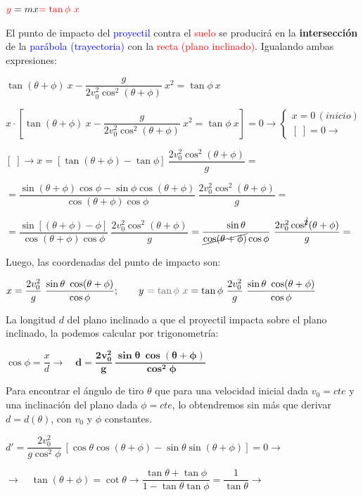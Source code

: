$\textcolor{red}{y}=mx\textcolor{red}{=\tan \phi \ x}$

El punto de impacto del \textcolor{blue}{proyectil} contra el \textcolor{red}{suelo} se producirá en la \textbf{intersección} de la \textcolor{blue}{parábola (trayectoria)} con la \textcolor{red}{recta (plano inclinado)}. Igualando ambas expresiones:

$\tan(\theta+\phi) \ x - \dfrac {g}{2 v_0^2 \cos^2 (\theta+\phi)}\ x^2=\tan \phi \ x$

$x\cdot \left[ 
\tan(\theta+\phi) \ x - \dfrac {g}{2 v_0^2 \cos^2 (\theta+\phi)}\ x^2=\tan \phi \ x
 \right]=0 \to  \begin{cases} x=0 \,(inicio) \\ [ \; ]=0 \to \end{cases}$


$[\;]\to x=\left[\tan (\theta+\phi)-\tan \phi  \right] \  \dfrac{2v_0^2 \cos^2(\theta+\phi)}{g} =$

$=\dfrac {\sin(\theta+\phi) \cos \phi-\sin \phi \cos(\theta+\phi)}{\cos(\theta+\phi) \cos \phi} \  \dfrac{2v_0^2 \cos^2(\theta+\phi)}{g} =$

$=\dfrac {\sin [(\theta+\phi)-\phi]}{\cos(\theta+\phi) \cos \phi} \ \dfrac{2v_0^2 \cos^2(\theta+\phi)}{g} $
$=\dfrac {\sin \theta}{\cancel{\cos(\theta+\phi)} \cos \phi} \ \dfrac{2v_0^2 \cos^{\cancel{2}}(\theta+\phi)}{g} =$


Luego, las coordenadas del punto de impacto son:

$x=\dfrac{2v_0^2}{g}\ \dfrac {\sin \theta \ \cos (\theta+\phi)}{\cos \phi}; \qquad y\ \textcolor{gris}{=\tan \phi \ x }= \tan \phi \ \dfrac{2v_0^2}{g}\ \dfrac {\sin \theta \ \cos (\theta+\phi)}{\cos \phi}$

La longitud $d$ del plano inclinado a que el proyectil impacta sobre el plano inclinado, la podemos calcular por trigonometría:

$\cos \phi = \dfrac x d \to \quad \boldsymbol{d= \dfrac{2v_0^2}{g}\ \dfrac {\sin \theta \ \cos (\theta+\phi)}{\cos^2 \phi} }$ 


Para encontrar el ángulo de tiro $\theta$ que para una velocidad inicial dada $v_0=cte$ y una inclinación del plano dada $\phi=cte$, lo obtendremos sin más que derivar $d=d(\theta)$, con $v_0$ y $\phi$ constantes. 

$d'=\dfrac {2 v_0^2}{g  \cos^2 \phi}\ \left[ \cos \theta \cos (\theta+\phi) - \sin \theta \sin(\theta+\phi) \right]=0 \to $

$ \to \quad \tan (\theta + \phi)=\cot \theta \to \dfrac {\tan \theta + \tan \phi}{1-\tan\theta \tan \phi}=\dfrac {1}{\tan \theta} \to $

